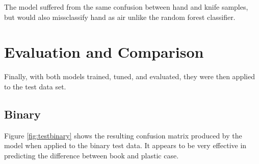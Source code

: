 \documentclass[12pt]{article}
\begin{document}
The model suffered from the same confusion between hand and knife samples, but would also missclassify hand as air unlike the random forest classifier. 

\section{Evaluation and Comparison}

Finally, with both models trained, tuned, and evaluated, they were then applied to the test data set.

\subsection{Binary}

Figure \ref{fig:testbinary} shows the resulting confusion matrix produced by the model when applied to the binary test data. It appears to be very effective in predicting the difference between book and plastic case.
\end{document}
